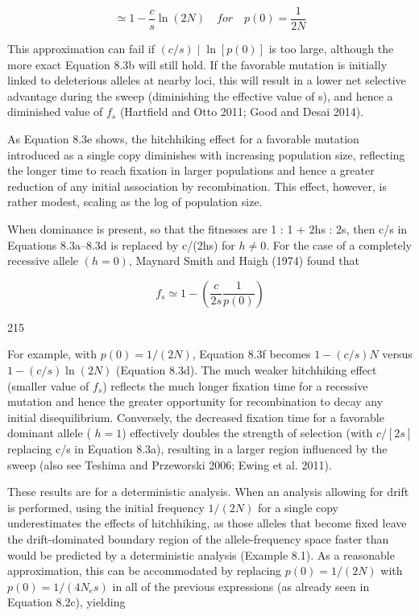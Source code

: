 \documentclass{article}
\begin{document}
\begin{equation}
\simeq1-\frac{c}{s}\ln(2N)\quad for\quad p(0)=\frac{1}{2N}
\tag{8.3e}
\label{eq:8_3e}
\end{equation}

This approximation can fail if  $ (c/s) \mid \ln [p(0)] $ is too large, although the more exact Equation 8.3b will still hold. If the favorable mutation is initially linked to deleterious alleles at nearby loci, this will result in a lower net selective advantage during the sweep (diminishing the effective value of s), and hence a diminished value of  $ f_s $ (Hartfield and Otto 2011; Good and Desai 2014).

As Equation 8.3e shows, the hitchhiking effect for a favorable mutation introduced as a single copy diminishes with increasing population size, reflecting the longer time to reach fixation in larger populations and hence a greater reduction of any initial association by recombination. This effect, however, is rather modest, scaling as the log of population size.

When dominance is present, so that the fitnesses are 1 : 1 + 2hs : 2s, then c/s in Equations 8.3a–8.3d is replaced by c/(2hs) for  $ h \neq 0 $. For the case of a completely recessive allele  $ (h = 0) $, Maynard Smith and Haigh (1974) found that

\begin{equation}
f_{s}\simeq1-\left(\frac{c}{2s}\frac{1}{p(0)}\right)
\tag{8.3f}
\label{eq:8_3f}
\end{equation}

215

For example, with  $ p(0) = 1/(2N) $, Equation 8.3f becomes  $ 1 - (c/s)N $ versus  $ 1 - (c/s)\ln(2N) $ (Equation 8.3d). The much weaker hitchhiking effect (smaller value of  $ f_s $) reflects the much longer fixation time for a recessive mutation and hence the greater opportunity for recombination to decay any initial disequilibrium. Conversely, the decreased fixation time for a favorable dominant allele ( $ h = 1 $) effectively doubles the strength of selection (with  $ c/[2s] $ replacing c/s in Equation 8.3a), resulting in a larger region influenced by the sweep (also see Teshima and Przeworski 2006; Ewing et al. 2011).

These results are for a deterministic analysis. When an analysis allowing for drift is performed, using the initial frequency  $ 1/(2N) $ for a single copy underestimates the effects of hitchhiking, as those alleles that become fixed leave the drift-dominated boundary region of the allele-frequency space faster than would be predicted by a deterministic analysis (Example 8.1). As a reasonable approximation, this can be accommodated by replacing  $ p(0) = 1/(2N) $ with  $ p(0) = 1/(4N_{e}s) $ in all of the previous expressions (as already seen in Equation 8.2c), yielding
\end{document}
